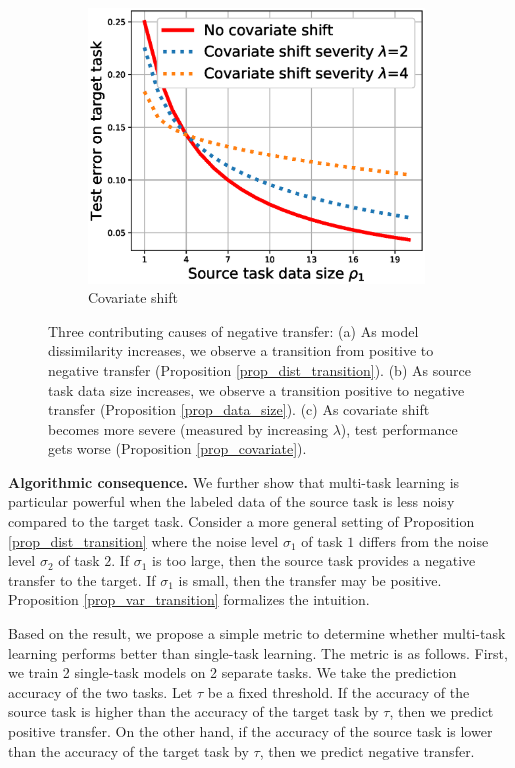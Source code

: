 \begin{figure}
	\begin{subfigure}[b]{0.32\textwidth}
		\centering
		\includegraphics[width=0.98\textwidth]{figures/complementary.eps}
		\caption{Covariate shift}
		\label{fig_covariate}
	\end{subfigure}
	\caption{Three contributing causes of negative transfer:
	(a) As model dissimilarity increases, we observe a transition from positive to negative transfer  (Proposition \ref{prop_dist_transition}).
	(b) As source task data size increases, we observe a transition positive to negative transfer (Proposition \ref{prop_data_size}).
	(c) As covariate shift becomes more severe (measured by increasing $\lambda$), test performance gets worse (Proposition \ref{prop_covariate}).}
	\label{fig_model_shift_phasetrans}
\end{figure}

\textbf{Algorithmic consequence.}
We further show that multi-task learning is particular powerful when the labeled data of the source task is less noisy compared to the target task.
Consider a more general setting of Proposition \ref{prop_dist_transition} where the noise level $\sigma_1$ of task $1$ differs from the noise level $\sigma_2$ of task $2$.
If $\sigma_1$ is too large, then the source task provides a negative transfer to the target.
If $\sigma_1$ is small, then the transfer may be positive.
Proposition \ref{prop_var_transition} formalizes the intuition.

Based on the result, we propose a simple metric to determine whether multi-task learning performs better than single-task learning.
The metric is as follows.
First, we train 2 single-task models on 2 separate tasks.
We take the prediction accuracy of the two tasks.
Let $\tau$ be a fixed threshold.
If the accuracy of the source task is higher than the accuracy of the target task by $\tau$, then we predict positive transfer.
On the other hand, if the accuracy of the source task is lower than the accuracy of the target task by $\tau$, then we predict negative transfer.

